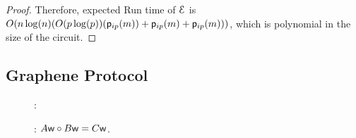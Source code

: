 \begin{proof}
	Therefore, expected Run time of $\mathcal{E}$ is $O(n\log(n)(O(p\log(p))(\mathsf{p}_{ip}(m)) + \mathsf{p}_{ip}(m) + \mathsf{p}_{ip}(m))) $, which is polynomial in the size of the circuit.
\end{proof}

\subsection{Graphene Protocol}
\begin{figure}[h!]
	{\footnotesize
		\begin{framed}
			:
			
			: $A\mathsf{w}\circ B\mathsf{w}=C\mathsf{w}$. 
			

\end{framed}}
\end{figure}
